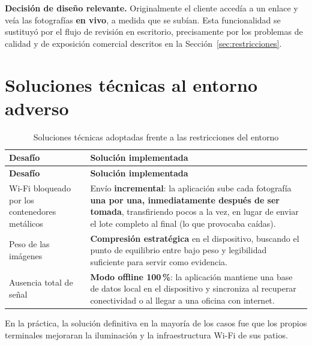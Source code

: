 \begin{nota}
\textbf{Decisión de diseño relevante.} Originalmente el cliente accedía a un enlace y veía las
fotografías \textbf{en vivo}, a medida que se subían. Esta funcionalidad se sustituyó por el flujo
de revisión en escritorio, precisamente por los problemas de calidad y de exposición comercial
descritos en la Sección~\ref{sec:restricciones}.
\end{nota}

\section{Soluciones técnicas al entorno adverso}
\label{sec:soluciones}

{\estilotabla
\begin{longtable}{L{0.30\textwidth} L{0.64\textwidth}}

\caption{Soluciones técnicas adoptadas frente a las restricciones del entorno}
\label{tab:solucionestecnicas}
\\

\toprule
\textbf{Desafío} & \textbf{Solución implementada} \\
\midrule
\endfirsthead

\toprule
\textbf{Desafío} & \textbf{Solución implementada} \\
\midrule
\endhead

Wi-Fi bloqueado por los contenedores metálicos &
Envío \textbf{incremental}: la aplicación sube cada fotografía \textbf{una por una, inmediatamente
después de ser tomada}, transfiriendo pocos  a la vez, en lugar de enviar el lote
completo al final (lo que provocaba caídas). \\

\midrule

Peso de las imágenes &
\textbf{Compresión estratégica} en el dispositivo, buscando el punto de equilibrio entre bajo peso
y legibilidad suficiente para servir como evidencia. \\

\midrule

Ausencia total de señal &
\textbf{Modo offline 100\,\%}: la aplicación mantiene una base de datos local en el dispositivo y
sincroniza al recuperar conectividad o al llegar a una oficina con internet. \\

\bottomrule

\end{longtable}
}

\begin{nota}
En la práctica, la solución definitiva en la mayoría de los casos fue que los propios terminales
mejoraran la iluminación y la infraestructura Wi-Fi de sus patios.
\end{nota}

